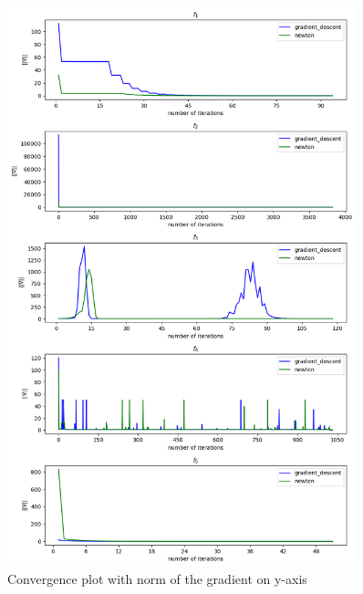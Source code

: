 \documentclass[a4paper]{article}
\begin{document}
\begin{figure}[]
    \centering
    \includegraphics[width=0.9\textwidth]{plt_grad100.png}
    \caption{Convergence plot with norm of the gradient on y-axis}
  \label{plt1}
\end{figure}
\end{document}
